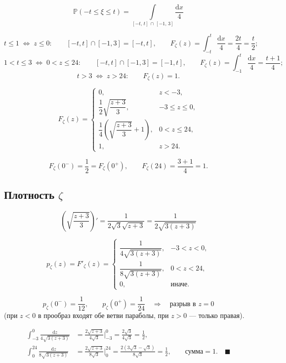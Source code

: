 \documentclass[12pt]{article}
\begin{document}
\[
    \mathbb{P}(-t \le \xi \le t)
    = \int\limits_{[-t,\,t]\,\cap\,[-1,\,3]} \frac{\mathrm{d}x}{4}
\]

\[
    t \le 1 \;\Leftrightarrow\; z \le 0: \qquad
    [-t,t] \cap [-1,3] = [-t,t], \qquad
    F_\zeta(z) = \int_{-t}^{t} \frac{\mathrm{d}x}{4} = \frac{2t}{4} = \frac{t}{2};
\]
\[
    1 < t \le 3 \;\Leftrightarrow\; 0 < z \le 24: \qquad
    [-t,t] \cap [-1,3] = [-1,t], \qquad
    F_\zeta(z) = \int_{-1}^{t} \frac{\mathrm{d}x}{4} = \frac{t+1}{4};
\]
\[
    t > 3 \;\Leftrightarrow\; z > 24: \qquad F_\zeta(z) = 1.
\]

\[
    \boxed{\;
    F_\zeta(z) =
    \begin{cases}
        0, & z < -3, \\[1ex]
        \dfrac{1}{2}\sqrt{\dfrac{z+3}{3}}, & -3 \le z \le 0, \\[2.5ex]
        \dfrac{1}{4}\left(\sqrt{\dfrac{z+3}{3}} + 1\right), & 0 < z \le 24, \\[2.5ex]
        1, & z > 24.
    \end{cases}
    \;}
\]

\[
    F_\zeta(0^-) = \frac{1}{2} = F_\zeta(0^+), \qquad F_\zeta(24) = \frac{3+1}{4} = 1.
\]

\subsection{Плотность $\zeta$}

\[
    \left(\sqrt{\frac{z+3}{3}}\right)' = \frac{1}{2\sqrt{3}\sqrt{z+3}} = \frac{1}{2\sqrt{3(z+3)}}
\]

\[
    \boxed{\;
    p_\zeta(z) = F'_\zeta(z) =
    \begin{cases}
        \dfrac{1}{4\sqrt{3(z+3)}}, & -3 < z < 0, \\[2.5ex]
        \dfrac{1}{8\sqrt{3(z+3)}}, & 0 < z < 24, \\[2.5ex]
        0, & \text{иначе}.
    \end{cases}
    \;}
\]

\[
    p_\zeta(0^-) = \frac{1}{12}, \qquad p_\zeta(0^+) = \frac{1}{24}
    \quad\Longrightarrow\quad \text{разрыв в } z = 0
\]
(при $z < 0$ в прообраз входят обе ветви параболы, при $z > 0$ --- только правая).

\begin{align*}
    \int_{-3}^{0} \frac{\mathrm{d}z}{4\sqrt{3(z+3)}}
    &= \frac{2\sqrt{z+3}}{4\sqrt{3}}\bigg|_{-3}^{0} = \frac{2\sqrt{3}}{4\sqrt{3}} = \frac{1}{2}, \\
    \int_{0}^{24} \frac{\mathrm{d}z}{8\sqrt{3(z+3)}}
    &= \frac{2\sqrt{z+3}}{8\sqrt{3}}\bigg|_{0}^{24} = \frac{2(3\sqrt{3}-\sqrt{3})}{8\sqrt{3}} = \frac{1}{2},
    \qquad \text{сумма} = 1. \quad\blacksquare
\end{align*}
\end{document}
